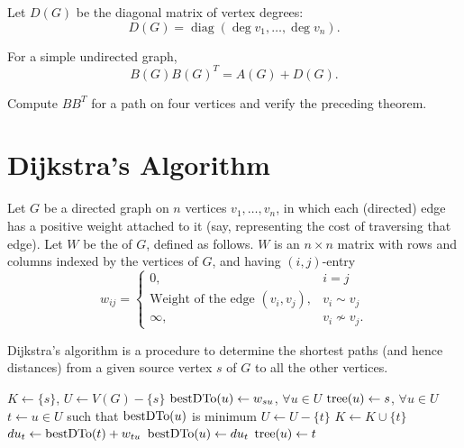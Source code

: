 Let $D(G)$ be the diagonal matrix of vertex degrees:
\begin{equation*}
D(G) = \operatorname{diag}(\deg v_1, \ldots, \deg v_n).
\end{equation*}

\begin{Theorem}
For a simple undirected graph,
\begin{equation*}
B(G)B(G)^T = A(G) + D(G).
\end{equation*}
\end{Theorem}

\begin{Exercise}
Compute $B B^T$ for a path on four vertices and verify the preceding theorem.
\end{Exercise}

\section{Dijkstra's Algorithm}\label{sec:Dijkstra}

Let $G$ be a directed graph on $n$ vertices $v_1, \ldots, v_n$, in which each (directed) edge has a positive weight attached to it (say, representing the cost of traversing that edge). Let $W$ be the  of $G$, defined as follows. $W$ is an $n \times n$ matrix with rows and columns indexed by the vertices of $G$, and having $(i,j)$-entry
\begin{equation*}
w_{ij} = \begin{cases}
0, & i = j\\
\text{Weight of the edge $(v_i, v_j)$}, & v_i \sim v_j\\
\infty, & v_i \not\sim v_j.
\end{cases}
\end{equation*}

Dijkstra's algorithm is a procedure to determine the shortest paths (and hence distances) from a given source vertex $s$ of $G$ to all the other vertices.

\begin{algorithm}\caption{Dijkstra's algorithm}\label{alg:Dijkstra}
\begin{algorithmic}[1]
	\State $K \gets \{s\}$, $U \gets V(G) - \{s\}$
	\State $\operatorname{bestDTo}(u) \gets w_{su}$, $\forall u \in U$
	\State $\operatorname{tree}(u) \gets s$, $\forall u \in U$
		\State $t \gets u \in U$ such that $\operatorname{bestDTo}(u)$ is minimum
		\State $U \gets U - \{t\}$ 
		\State $K \gets K \cup \{t\}$ 
			\State $du_t \gets \operatorname{bestDTo}(t) + w_{tu}$ 
				\State $\operatorname{bestDTo}(u) \gets du_t$
				\State $\operatorname{tree}(u) \gets t$
			\EndIf
		\EndFor
	\EndWhile
\end{algorithmic}
\end{algorithm}

